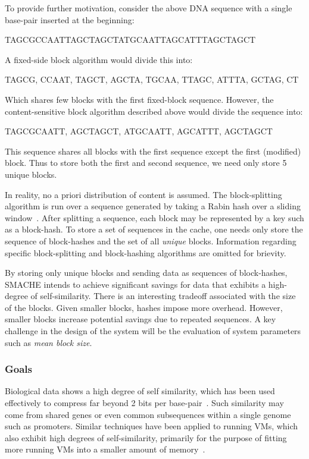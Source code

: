 \documentclass{article}[12pt]
\begin{document}
To provide further motivation, consider the above DNA sequence with a single
base-pair inserted at the beginning:
\begin{center}
TAGCGCCAATTAGCTAGCTATGCAATTAGCATTTAGCTAGCT
\end{center}
A fixed-side block algorithm would divide this into:
\begin{center}
TAGCG, CCAAT, TAGCT, AGCTA, TGCAA, TTAGC, ATTTA, GCTAG, CT
\end{center}
Which shares few blocks with the first fixed-block sequence.  However, the
content-sensitive block algorithm described above would divide the sequence
into:
\begin{center}
TAGCGCAATT, AGCTAGCT, ATGCAATT, AGCATTT, AGCTAGCT
\end{center}
This sequence shares all blocks with the first sequence except the first
(modified) block.  Thus to store both the first and second sequence, we need
only store 5 unique blocks.

In reality, no a priori distribution of content is assumed.  The
block-splitting algorithm is run over a sequence generated by taking a Rabin
hash over a sliding window~\cite{rabin}.  After splitting a sequence, each
block may be represented by a key such as a block-hash.  To store a set of
sequences in the cache, one needs only store the sequence of block-hashes and
the set of all {\em unique} blocks.  Information regarding specific
block-splitting and block-hashing algorithms are omitted for brievity.

By storing only unique blocks and sending data as sequences of block-hashes,
SMACHE intends to achieve significant savings for data that exhibits a
high-degree of self-similarity.  There is an interesting tradeoff associated
with the size of the blocks.  Given smaller blocks, hashes impose more
overhead.  However, smaller blocks increase potential savings due to repeated
sequences.  A key challenge in the design of the system will be the evaluation
of system parameters such as {\em mean block size}.

\subsubsection{Goals}
\label{sec:goals}

Biological data shows a high degree of self similarity, which has been used
effectively to compress far beyond 2 bits per base-pair~\cite{biosequence}.
Such similarity may come from shared genes or even common subsequences within a
single genome such as promoters.  Similar techniques have been applied to
running VMs, which also exhibit high degrees of self-similarity, primarily for
the purpose of fitting more running VMs into a smaller amount of
memory~\cite{difference-engine}.
\end{document}
